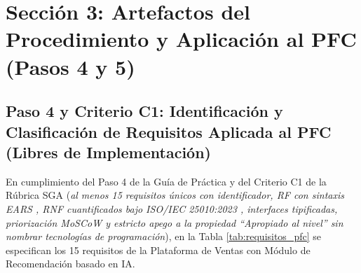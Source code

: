 \section{Sección 3: Artefactos del Procedimiento y Aplicación al PFC (Pasos 4 y 5)}
\subsection{Paso 4 y Criterio C1: Identificación y Clasificación de Requisitos Aplicada al PFC (Libres de Implementación)}
En cumplimiento del Paso 4 de la Guía de Práctica y del Criterio C1 de la Rúbrica SGA (\textit{al menos 15 requisitos únicos con identificador, RF con sintaxis EARS \cite{mavin2009ears}, RNF cuantificados bajo ISO/IEC 25010:2023 \cite{iso25010}, interfaces tipificadas, priorización MoSCoW \cite{ireb2023} y estricto apego a la propiedad ``Apropiado al nivel'' sin nombrar tecnologías de programación}), en la Tabla \ref{tab:requisitos_pfc} se especifican los 15 requisitos de la Plataforma de Ventas con Módulo de Recomendación basado en IA.
